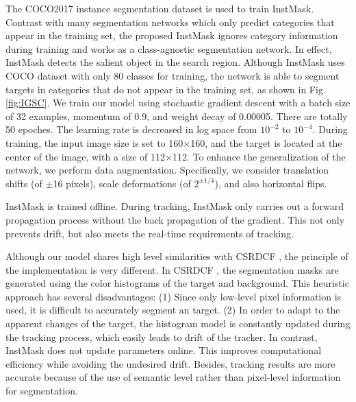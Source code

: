 The COCO2017 \cite{COCO} instance segmentation dataset is used to train InstMask.
Contrast with many segmentation networks which only predict categories that appear in the training set, the proposed InstMask ignores category information during training and works as a class-agnostic segmentation network. In effect, InstMask detects the salient object in the search region. Although InstMask uses COCO dataset \cite{COCO} with only 80 classes for training, the network is able to segment targets in categories that do not appear in the training set, as shown in Fig. \ref{fig:IGSC}.
We train our model using stochastic gradient descent with a batch size of 32 examples, momentum of 0.9, and weight decay of 0.00005. There are totally 50 epoches. The learning rate is decreased in log space from $10^{-2}$ to $10^{-4}$. During training, the input image size is set to 160$\times$160, and the target is located at the center of the image, with a size of 112$\times$112. To enhance the generalization of the network, we perform data augmentation. Specifically, we consider translation shifts (of $\pm$16 pixels), scale deformations (of $2^{\pm 1/4}$), and also horizontal flips.

InstMask is trained offline. During tracking, InstMask only carries out a forward propagation process without the back propagation of the gradient. This not only prevents drift, but also meets the real-time requirements of tracking.

Although our model shares high level similarities with CSRDCF \cite{Lukezic2017DiscriminativeCF}, the principle of the implementation is very different.
In CSRDCF \cite{Lukezic2017DiscriminativeCF}, the segmentation masks are generated using the color histograms of the target and background. This heuristic approach has several disadvantages: (1) Since only low-level pixel information is used, it is difficult to accurately segment an target. (2) In order to adapt to the apparent changes of the target, the histogram model is constantly updated during the tracking process, which easily leads to drift of the tracker. In contrast, InstMask does not update parameters online. This improves computational efficiency while avoiding the undesired drift. Besides, tracking results are more accurate because of the use of semantic level rather than pixel-level information for segmentation.

